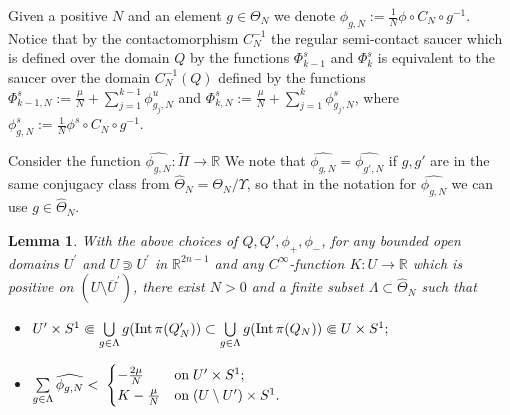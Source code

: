 \documentclass[12pt]{paper}
\theoremstyle{plain}
\newtheorem{lemma}[theorem]{Lemma}
\theoremstyle{definition}
\newcommand{\wt}{\widetilde}
\newcommand{\wh}{\widehat}
\newcommand{\R}{{\mathbb{R}}}
\newcommand{\Int}{{\rm Int\,}} %
\numberwithin{figure}{section}
\begin{document}

 

Given   a positive  $N$  and  an element $g\in \Theta_N$ we denote
 $\phi_{g,N}:=\frac1N\phi\circ C_N\circ g^{-1}$.
 Notice that by the contactomorphism $C_N^{-1}$ the regular semi-contact  saucer which is defined over the domain $Q$ by the  functions $\Phi^s_{k-1}$ and $\Phi^s_{k}$ is equivalent to the saucer  over the domain $ C_N^{-1}(Q)$ defined by the functions $\Phi^s_{k-1,N}:=\frac\mu N+ \sum\limits_{j=1}^{k-1}\phi^u_{g_j,N}$ and  $\Phi^s_{k,N}:=\frac\mu N+ \sum\limits_{j=1}^{k}\phi^s_{g_j,N}$, where
 $\phi^s_{g,N}:=\frac1N\phi^s\circ C_N\circ g^{-1}$.
 
Consider the function $\wh{\phi_{g,N}}: \wt\Pi \to \R$ We note that $\wh{\phi_{g,N}}=\wh{\phi_{g',N}}$ if $g,g'$ are in the same conjugacy class from $\wh\Theta_N=\Theta_N/\Upsilon$, so that in the notation for $\wh{\phi_{g,N}}$ we can use $g\in\wh \Theta_N$.

      
 \begin{lemma}\label{lm:positive-decomposition}
With the above choices of $Q,Q',\phi_+,\phi_-$,  for  any bounded open domains $U^\prime$ and $U\Supset U^\prime$ in $\R^{2n-1}$ and any $C^\infty$-function $K\colon
U\to\R$  which is positive on $(U\setminus\overline U^\prime)$, there exist
$N>0$ and a finite subset $\Lambda \subset\wh\Theta_N$ 
     such that
     \begin{itemize}
     \item  $ U^\prime \times S^1 \Subset  \bigcup \limits_{g\in \Lambda} g(\Int \pi(Q'_N))\subset   \bigcup \limits_{g\in \Lambda} g(\Int \pi(Q_N)) \Subset  U \times S^1;$ 
 \item  $  \sum\limits_{g\in  \Lambda}\wh{\phi_{ g,N}}  < \;
  \begin{cases}
  -\frac{2\mu} N& \hbox{on}\; U'\times S^1;\cr
  K - \frac\mu N& \hbox{on}\; (U\setminus U')\times S^1.
  \end{cases}
   $
   \end{itemize}
 \end{lemma}
  
\end{document}
